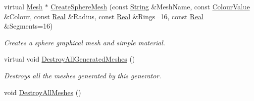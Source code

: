 \begin{DoxyCompactItemize}
virtual \hyperlink{classphys_1_1Mesh}{Mesh} $\ast$ \hyperlink{classphys_1_1MeshManager_a2b899a10f14fccc4a330194bb7534c52}{CreateSphereMesh} (const \hyperlink{namespacephys_aa03900411993de7fbfec4789bc1d392e}{String} \&MeshName, const \hyperlink{classphys_1_1ColourValue}{ColourValue} \&Colour, const \hyperlink{namespacephys_af7eb897198d265b8e868f45240230d5f}{Real} \&Radius, const \hyperlink{namespacephys_af7eb897198d265b8e868f45240230d5f}{Real} \&Rings=16, const \hyperlink{namespacephys_af7eb897198d265b8e868f45240230d5f}{Real} \&Segments=16)
\begin{DoxyCompactList}\small\item\em Creates a sphere graphical mesh and simple material. \item\end{DoxyCompactList}\item 
\hypertarget{classphys_1_1MeshManager_a4fab054dcafc05aed8c68eef8017596a}{
virtual void \hyperlink{classphys_1_1MeshManager_a4fab054dcafc05aed8c68eef8017596a}{DestroyAllGeneratedMeshes} ()}
\label{classphys_1_1MeshManager_a4fab054dcafc05aed8c68eef8017596a}

\begin{DoxyCompactList}\small\item\em Destroys all the meshes generated by this generator. \item\end{DoxyCompactList}\item 
\hypertarget{classphys_1_1MeshManager_a33fe49526cdaf0628305322150394b37}{
void \hyperlink{classphys_1_1MeshManager_a33fe49526cdaf0628305322150394b37}{DestroyAllMeshes} ()}
\label{classphys_1_1MeshManager_a33fe49526cdaf0628305322150394b37}


\end{DoxyCompactItemize}

